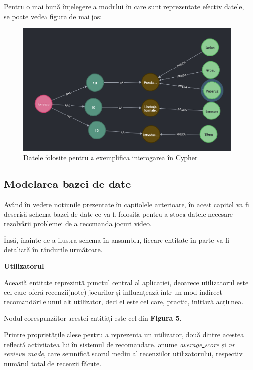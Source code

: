 \documentclass[12pt,a4paper]{report}
\begin{document}
Pentru o mai bună înțelegere a modului în care sunt reprezentate efectiv datele, se poate vedea figura de mai jos:

\begin{figure}[H]
\centering
\caption{}
\includegraphics[scale=0.5]{exemplu_4_neo4j}
\caption*{Datele folosite pentru a exemplifica interogarea în Cypher}
\end{figure}

\subsection{Modelarea bazei de date}


Având în vedere noțiunile prezentate în capitolele anterioare, în acest capitol va fi descrisă schema bazei de date ce va fi folosită pentru a stoca datele necesare rezolvării problemei de a recomanda jocuri video.

Însă, înainte de a ilustra schema în ansamblu, fiecare entitate în parte va fi detaliată în rândurile următoare.

\bigskip
\textbf{Utilizatorul}
\bigskip

Această entitate reprezintă punctul central al aplicației, deoarece utilizatorul este cel care oferă recenzii(note) jocurilor și influențează într-un mod indirect recomandările unui alt utilizator, deci el este cel care, practic, inițiază acțiunea.

Nodul corespunzător acestei entități este cel din \textbf{Figura 5}.

Printre proprietățile alese pentru a reprezenta un utilizator, două dintre acestea reflectă activitatea lui în sistemul de recomandare, anume \emph{average\underline{ }score} și \emph{nr\underline{ }reviews\underline{ }made}, care semnifică scorul mediu al recenziilor utilizatorului, respectiv numărul total de recenzii făcute.
\end{document}
